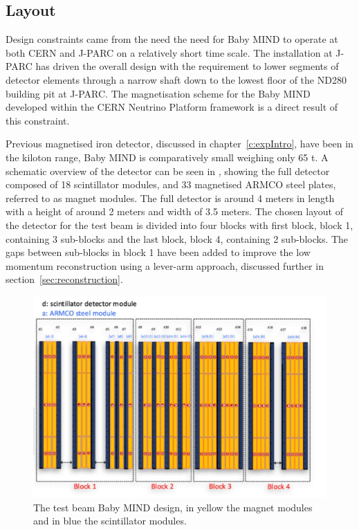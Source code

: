 \subsection{Layout}
Design constraints came from the need the need for Baby MIND to operate at both CERN and J-PARC on a relatively short time scale. The installation at J-PARC has driven the overall design with the requirement to lower segments of detector elements through a narrow shaft down to the lowest floor of the ND280 building pit at J-PARC. The magnetisation scheme for the Baby MIND developed within the CERN Neutrino Platform framework is a direct result of this constraint.

Previous magnetised iron detector, discussed in chapter~\ref{c:expIntro}, have been in the kiloton range, Baby MIND is comparatively small weighing only 65 t. A schematic overview of the detector can be seen in , showing the full detector composed of 18 scintillator modules, and 33 magnetised ARMCO steel plates, referred to as magnet modules. The full detector is around 4 meters in length with a height of around 2 meters and width of 3.5 meters. The chosen layout of the detector for the test beam is divided into four blocks with first block, block 1, containing 3 sub-blocks and the last block, block 4, containing 2 sub-blocks. The gaps between sub-blocks in block 1 have been added to improve the low momentum reconstruction using a lever-arm approach, discussed further in section~\ref{sec:reconstruction}.



\begin{figure}[h!]
\centering
\includegraphics[width=\textwidth]{figures/MIND.jpeg}
\caption{The test beam Baby MIND design, in yellow the magnet modules and in blue the scintillator modules.}
\label{fig:design}
\end{figure}

